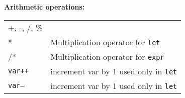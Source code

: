 \textbf{Arithmetic operations:}

\begin{tabularx}{\linewidth}{lX}
+, -, /, \% & \\
* & Multiplication operator for \texttt{let}\\
/* & Multiplication operator for \texttt{expr}\\
\texttt{var++} & increment var by 1 used only in \texttt{let}\\
\texttt{var--} & increment var by 1 used only in \texttt{let}
\end{tabularx}


\vfill\null
\pagebreak

